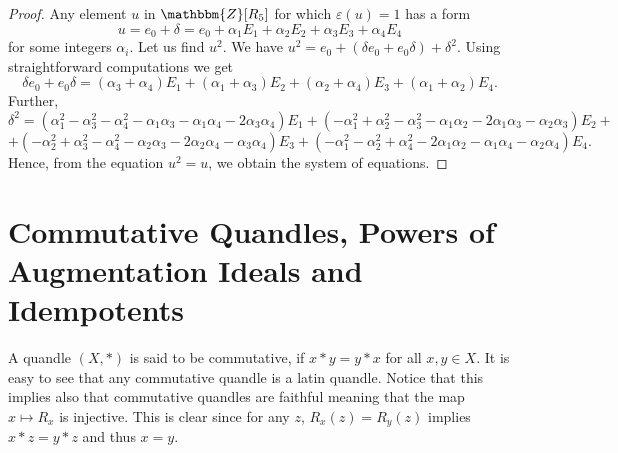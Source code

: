 \documentclass[12pt]{amsart}
\theoremstyle{definition}
\theoremstyle{remark}
\begin{document}
\begin{proof}
Any element $u$ in $\mathbbm {Z}[R_5]$ for which $\varepsilon(u) = 1$ has a form 
$$
u = e_0 + \delta = e_0 + \alpha_1 E_1 + \alpha_2 E_2 + \alpha_3 E_3 + \alpha_4 E_4
$$
for some integers $\alpha_i$. Let us find $u^2$. We have $u^2 = e_0 + (\delta e_0 + e_0 \delta) + \delta^2$. Using straightforward computations we get
$$
\delta e_0 + e_0 \delta = (\alpha_3  + \alpha_4)  E_1 +  (\alpha_1  + \alpha_3)  E_2 +  (\alpha_2  + \alpha_4)  E_3 +  (\alpha_1  + \alpha_2)  E_4.
$$
Further,
$$
\delta^2 = (\alpha_1^2 - \alpha_3^2 - \alpha_4^2 - \alpha_1\alpha_3  - \alpha_1 \alpha_4  - 2 \alpha_3 \alpha_4) E_1 +
 (- \alpha_1^2 + \alpha_2^2 - \alpha_3^2 - \alpha_1\alpha_2  - 2 \alpha_1 \alpha_3  -  \alpha_2 \alpha_3) E_2 +
$$
$$ 
+ (- \alpha_2^2 + \alpha_3^2 - \alpha_4^2 - \alpha_2\alpha_3  - 2 \alpha_2 \alpha_4  -  \alpha_3 \alpha_4) E_3 +
  (- \alpha_1^2 - \alpha_2^2 + \alpha_4^2 - 2 \alpha_1\alpha_2  -  \alpha_1 \alpha_4  -  \alpha_2 \alpha_4) E_4.
$$
Hence, from the equation $u^2 = u$, we obtain the system of equations.
\end{proof}




\section{Commutative Quandles, Powers of Augmentation Ideals and Idempotents} \label{PowerIdealCommutative}

A quandle $(X, *)$ is said to be commutative, if $x * y = y * x$ for all $x, y \in X$. It is easy to see that any commutative quandle is a latin quandle.    Notice that this implies also that commutative quandles are faithful meaning that the map $x \mapsto R_x$ is injective.  This is clear since for any $z$, $R_x(z)=R_y(z)$ implies $x*z=y*z$ and thus $x=y$.
\end{document}
